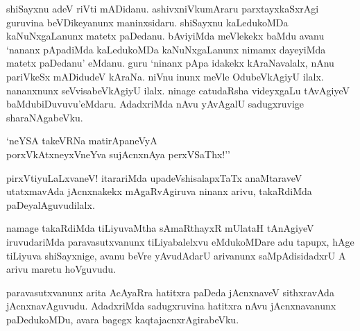shiSayxnu adeV riVti mADidanu. ashivxniVkumAraru parxtayxkaSxrAgi guruvina beVDikeyanunx maninxsidaru. shiSayxnu kaLedukoMDa kaNuNxgaLanunx matetx paDedanu. bAviyiMda meVlekekx baMdu avanu `nananx pApadiMda kaLedukoMDa kaNuNxgaLanunx nimamx dayeyiMda matetx paDedanu' eMdanu. guru `ninanx pApa idakekx kAraNavalalx, nAnu pariVkeSx mADidudeV kAraNa. niVnu inunx meVle OdubeVkAgiyU ilalx. nananxnunx seVvisabeVkAgiyU ilalx. ninage catudaRsha videyxgaLu tAvAgiyeV baMdubiDuvuvu'eMdaru. AdadxriMda nAvu yAvAgalU sadugxruvige sharaNAgabeVku.

\begin{shloka}
`neYSA takeVRNa matirApaneVyA\\
porxVkAtxneyxVneYva sujAcnxnAya perxVSaThx!''
\end{shloka}


pirxVtiyuLaLxvaneV! itarariMda upadeVshisalapxTaTx anaMtaraveV utatxmavAda jAcnxnakekx mAgaRvAgiruva ninanx arivu, takaRdiMda paDeyalAguvudilalx.

namage takaRdiMda tiLiyuvaMtha sAmaRthayxR mUlataH tAnAgiyeV iruvudariMda paravasutxvanunx tiLiyabalelxvu eMdukoMDare adu tapupx, hAge tiLiyuva shiSayxnige, avanu beVre yAvudAdarU arivanunx saMpAdisidadxrU A arivu maretu hoVguvudu. 

paravasutxvanunx arita AcAyaRra hatitxra paDeda jAcnxnaveV sithxravAda jAcnxnavAguvudu. AdadxriMda sadugxruvina hatitxra nAvu jAcnxnavanunx paDedukoMDu, avara bagegx kaqtajacnxrAgirabeVku.




\endchapter
